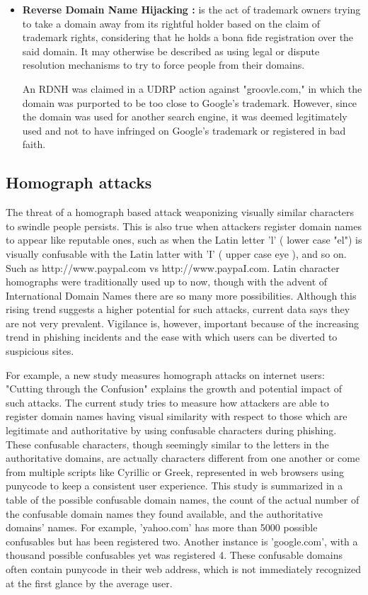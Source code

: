 \begin{itemize}
     \item \textbf{Reverse Domain Name Hijacking  :} is the act of trademark owners trying to take a domain away from its rightful holder based on the claim of trademark rights, considering that he holds a bona fide registration over the said domain. It may otherwise be described as using legal or dispute resolution mechanisms to try to force people from their domains. \cite{Sun2006DomainTrademarkConflict}

    An RDNH was claimed in a UDRP action against "groovle.com," in which the domain was purported to be too close to Google's trademark. However, since the domain was used for another search engine, it was deemed legitimately used and not to have infringed on Google's trademark or registered in bad faith. \cite{Singh2011ReverseDomainHijacking}
\end{itemize}


\subsection {Homograph attacks} 

The threat of a homograph based attack weaponizing visually similar characters to swindle people persists. This is also true when attackers register domain names to appear like reputable ones, such as when the Latin letter 'l' ( lower case "el") is visually confusable with the Latin latter with 'I' ( upper case eye ), and so on. Such as http://www.paypal.com vs http://www.paypaI.com.  Latin character homographs were traditionally used up to now, though with the advent of International Domain Names there are so many more possibilities. Although this rising trend suggests a higher potential for such attacks, current data says they are not very prevalent. Vigilance is, however, important because of the increasing trend in phishing incidents and the ease with which users can be diverted to suspicious sites.

For example, a new study measures homograph attacks on internet users: "Cutting through the Confusion" explains the growth and potential impact of such attacks. \cite{holgers2006homograph} The current study tries to measure how attackers are able to register domain names having visual similarity with respect to those which are legitimate and authoritative by using confusable characters during phishing. These confusable characters, though seemingly similar to the letters in the authoritative domains, are actually characters different from one another or come from multiple scripts like Cyrillic or Greek, represented in web browsers using punycode to keep a consistent user experience. This study is summarized in a table of the possible confusable domain names, the count of the actual number of the confusable domain names they found available, and the authoritative domains' names. For example, 'yahoo.com' has more than 5000 possible confusables but has been registered two. Another instance is 'google.com', with a thousand possible confusables yet was registered 4. These confusable domains often contain punycode in their web address, which is not immediately recognized at the first glance by the average user.


